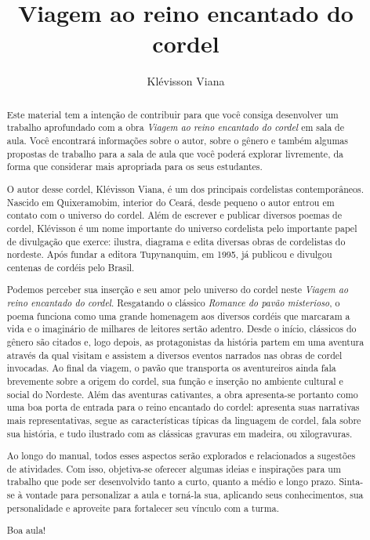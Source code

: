 \documentclass[11pt]{extarticle}
\newcommand{\AutorLivro}{Klévisson Viana}
\newcommand{\TituloLivro}{Viagem ao reino encantado do cordel}
\newcommand{\colaborador}{Paulo Pompermaier}
\begin{document}
\title{\TituloLivro}
\author{\AutorLivro}
\def\authornotes{\colaborador}

\date{}
\maketitle

\tableofcontents

\begin{abstract}
Este material tem a intenção de contribuir para que você consiga desenvolver um trabalho aprofundado com a obra \textit{Viagem ao reino encantado do cordel} em sala de aula.
Você encontrará informações sobre o autor, sobre o gênero e também 
algumas propostas de trabalho para a sala de aula que você poderá explorar livremente, 
da forma que considerar mais apropriada para os seus estudantes.

O autor desse cordel, Klévisson Viana, é um dos principais cordelistas contemporâneos.
Nascido em Quixeramobim, interior do Ceará, desde pequeno o autor entrou em contato com o universo do cordel.
Além de escrever e publicar diversos poemas de cordel, Klévisson é um nome importante do universo cordelista pelo importante papel de divulgação que exerce: ilustra, diagrama e edita diversas obras de cordelistas do nordeste. 
Após fundar a editora Tupynanquim, em 1995, já publicou e divulgou centenas de cordéis pelo Brasil.

Podemos perceber sua inserção e seu amor pelo universo do cordel neste
\textit{Viagem ao reino encantado do cordel}. Resgatando o clássico \textit{Romance do pavão misterioso}, o poema funciona como uma grande homenagem aos diversos cordéis que marcaram a vida e o imaginário de milhares de leitores sertão adentro. Desde o início, clássicos do gênero são citados e, logo depois, as protagonistas da história partem em uma aventura através da qual visitam e assistem a diversos eventos narrados nas obras de cordel invocadas. Ao final da viagem, o pavão que transporta os aventureiros ainda fala brevemente sobre a origem do cordel, sua função e inserção no ambiente cultural e social do Nordeste.
Além das aventuras cativantes, a obra apresenta-se portanto como uma boa porta de entrada para o reino encantado do cordel: apresenta suas narrativas mais representativas, segue as características típicas da linguagem de cordel, fala sobre sua história, e tudo ilustrado com as clássicas gravuras em madeira, ou xilogravuras.

Ao longo do manual, todos esses aspectos serão explorados e relacionados a sugestões de atividades. Com isso, objetiva-se oferecer algumas ideias e inspirações para um trabalho que pode ser desenvolvido tanto a curto, quanto a médio e longo prazo. Sinta-se à vontade para personalizar a aula e torná-la sua, aplicando seus conhecimentos, sua 
personalidade e aproveite para fortalecer seu vínculo com a turma.

Boa aula!
\end{abstract}
\end{document}
